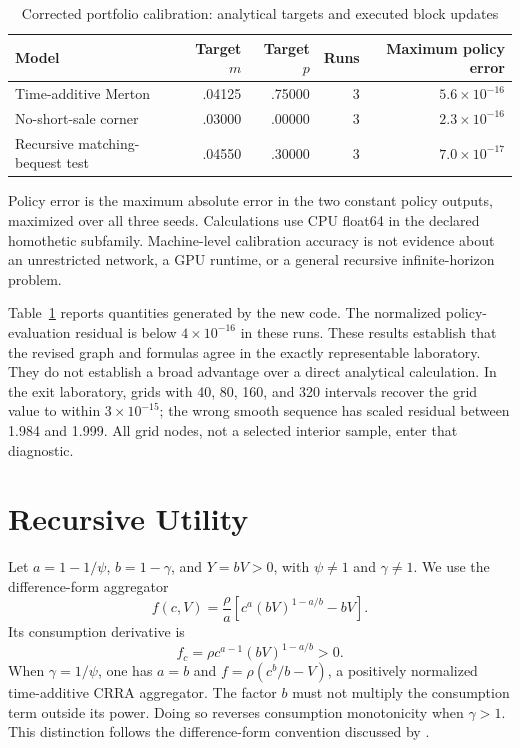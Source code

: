 \begin{table}[t]
\centering
\caption{Corrected portfolio calibration: analytical targets and executed block updates}\label{tab:portfolio}
\begin{tabular}{lrrrr}
\toprule
Model & Target $m$ & Target $p$ & Runs & Maximum policy error\\
\midrule
Time-additive Merton & .04125 & .75000 & 3 & $5.6\times10^{-16}$\\
No-short-sale corner & .03000 & .00000 & 3 & $2.3\times10^{-16}$\\
Recursive matching-bequest test & .04550 & .30000 & 3 & $7.0\times10^{-17}$\\
\bottomrule
\end{tabular}
\par\smallskip\footnotesize Policy error is the maximum absolute error in the two constant policy outputs, maximized over all three seeds. Calculations use CPU float64 in the declared homothetic subfamily. Machine-level calibration accuracy is not evidence about an unrestricted network, a GPU runtime, or a general recursive infinite-horizon problem.
\end{table}

Table~\ref{tab:portfolio} reports quantities generated by the new code. The normalized policy-evaluation residual is below $4\times10^{-16}$ in these runs. These results establish that the revised graph and formulas agree in the exactly representable laboratory. They do not establish a broad advantage over a direct analytical calculation. In the exit laboratory, grids with 40, 80, 160, and 320 intervals recover the grid value to within $3\times10^{-15}$; the wrong smooth sequence has scaled residual between 1.984 and 1.999. All grid nodes, not a selected interior sample, enter that diagnostic.

\section{Recursive Utility}\label{sec:recursive}
Let $a=1-1/\psi$, $b=1-\gamma$, and $Y=bV>0$, with $\psi\ne1$ and $\gamma\ne1$. We use the difference-form aggregator
\begin{equation}\label{eq:ez}
 f(c,V)=\frac\rho a\left[c^a(bV)^{1-a/b}-bV\right].
\end{equation}
Its consumption derivative is
\begin{equation}\label{eq:ezderivative}
 f_c=\rho c^{a-1}(bV)^{1-a/b}>0.
\end{equation}
When $\gamma=1/\psi$, one has $a=b$ and $f=\rho(c^b/b-V)$, a positively normalized time-additive CRRA aggregator. The factor $b$ must not multiply the consumption term outside its power. Doing so reverses consumption monotonicity when $\gamma>1$. This distinction follows the difference-form convention discussed by \citet{herdegen2021}.

